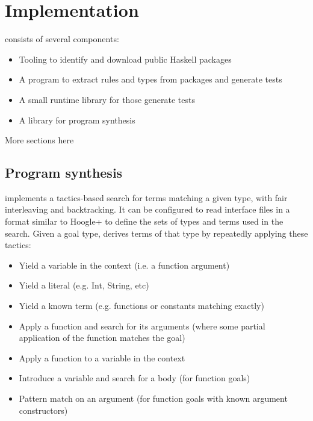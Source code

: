 \section{Implementation}
\label{sec:implementation}

\Rulecheck consists of several components:

\begin{itemize}
  \item Tooling to identify and download public Haskell packages
  \item A program to extract rules and types from packages and generate tests
  \item A small runtime library for those generate tests
  \item A library for program synthesis
\end{itemize}

More sections here

\subsection{Program synthesis}

\Rulecheck implements a tactics-based search for terms matching a given type, with fair interleaving and backtracking. \cite{delahaye2000tactic, kiselyov2005backtracking} It can be configured to read interface files in a format similar to Hoogle+ \cite{james2020digging} to define the sets of types and terms used in the search. Given a goal type, \Rulecheck derives terms of that type by repeatedly applying these tactics:

\begin{itemize}
  \item Yield a variable in the context (i.e. a function argument)
  \item Yield a literal (e.g. Int, String, etc)
  \item Yield a known term (e.g. functions or constants matching exactly)
  \item Apply a function and search for its arguments (where some partial application of the function matches the goal)
  \item Apply a function to a variable in the context
  \item Introduce a variable and search for a body (for function goals)
  \item Pattern match on an argument (for function goals with known argument constructors)
\end{itemize}

